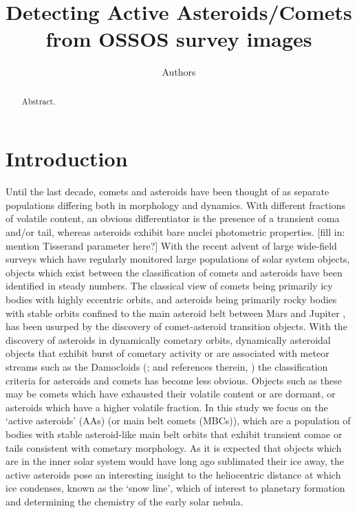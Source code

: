 \documentclass[iop,apj]{emulateapj}
\begin{document}
\title{Detecting Active Asteroids/Comets from OSSOS survey images}
\author{Authors}

\begin{abstract}
Abstract.
\end{abstract}

\maketitle

\section{Introduction}

Until the last decade, comets and asteroids have been thought of as separate populations differing both in morphology and dynamics. With different fractions of volatile content, an obvious differentiator is the presence of a transient coma and/or tail, whereas asteroids exhibit bare nuclei photometric properties. [fill in: mention Tisserand parameter here?]  With the recent advent of large wide-field surveys which have regularly monitored large populations of solar system objects, objects which exist between the classification of comets and asteroids have been identified in steady numbers. The classical view of comets being primarily icy bodies with highly eccentric orbits, and asteroids being primarily rocky bodies with stable orbits confined to the main asteroid belt between Mars and Jupiter \citep{sheppard14}, has been usurped by the discovery of comet-asteroid transition objects. With the discovery of asteroids in dynamically cometary orbits, dynamically asteroidal objects that exhibit burst of cometary activity or are associated with meteor streams such as the Damocloids (\cite{sonnett11}; and references therein, \cite{gilbert09}) the classification criteria for asteroids and comets has become less obvious. Objects such as these may be comets which have exhausted their volatile content or are dormant, or asteroids which have a higher volatile fraction. In this study we focus on the `active asteroids' (AAs) (or main belt comets (MBCs)), which are a population of bodies with stable asteroid-like main belt orbits that exhibit transient comae or tails consistent with cometary morphology.  As it is expected that objects which are in the inner solar system would have long ago sublimated their ice away, the active asteroids pose an interesting insight to the heliocentric distance at which ice condenses, known as the `snow line', which of interest to planetary formation and determining the chemistry of the early solar nebula.
\end{document}
